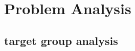 



\chapter{Problem Analysis}






\section{target group analysis}



\begingroup
	\raggedright
\endgroup

